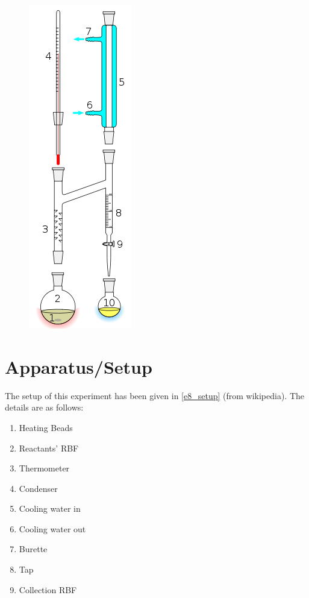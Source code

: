 	\begin{figure}[bth]
		\begin{center}
			\includegraphics[width=0.4\linewidth]{gfx/e8_setup}
		\end{center}
	\caption[2-Naphthol]{\label{e8_setup}}
	\end{figure}
\section {Apparatus/Setup}
	The setup of this experiment has been given in \autoref{e8_setup} (from wikipedia). The details are as follows:
	\begin{enumerate}
		\item Heating Beads
		\item Reactants' RBF
		\item Thermometer
		\item Condenser
		\item Cooling water in
		\item Cooling water out
		\item Burette
		\item Tap
		\item Collection RBF
	\end{enumerate}

